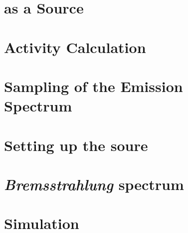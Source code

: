 
\section{ as a Source}

\newpage
\section{Activity Calculation}


\section{Sampling of the Emission Spectrum}


\section{Setting up the soure}


\section{\emph{Bremsstrahlung} spectrum}


\section{Simulation}
